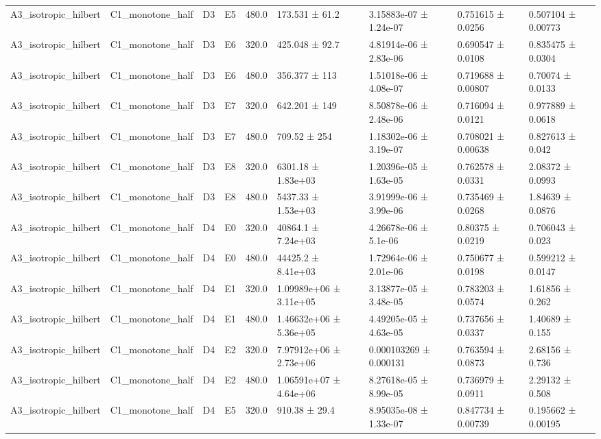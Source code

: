\begin{table}
\begin{tabular}{lllllllll}
A3\_isotropic\_hilbert & C1\_monotone\_half & D3 & E5 & 480.0 & 173.531 ± 61.2 & 3.15883e-07 ± 1.24e-07 & 0.751615 ± 0.0256 & 0.507104 ± 0.00773 \\
A3\_isotropic\_hilbert & C1\_monotone\_half & D3 & E6 & 320.0 & 425.048 ± 92.7 & 4.81914e-06 ± 2.83e-06 & 0.690547 ± 0.0108 & 0.835475 ± 0.0304 \\
A3\_isotropic\_hilbert & C1\_monotone\_half & D3 & E6 & 480.0 & 356.377 ± 113 & 1.51018e-06 ± 4.08e-07 & 0.719688 ± 0.00807 & 0.70074 ± 0.0133 \\
A3\_isotropic\_hilbert & C1\_monotone\_half & D3 & E7 & 320.0 & 642.201 ± 149 & 8.50878e-06 ± 2.48e-06 & 0.716094 ± 0.0121 & 0.977889 ± 0.0618 \\
A3\_isotropic\_hilbert & C1\_monotone\_half & D3 & E7 & 480.0 & 709.52 ± 254 & 1.18302e-06 ± 3.19e-07 & 0.708021 ± 0.00638 & 0.827613 ± 0.042 \\
A3\_isotropic\_hilbert & C1\_monotone\_half & D3 & E8 & 320.0 & 6301.18 ± 1.83e+03 & 1.20396e-05 ± 1.63e-05 & 0.762578 ± 0.0331 & 2.08372 ± 0.0993 \\
A3\_isotropic\_hilbert & C1\_monotone\_half & D3 & E8 & 480.0 & 5437.33 ± 1.53e+03 & 3.91999e-06 ± 3.99e-06 & 0.735469 ± 0.0268 & 1.84639 ± 0.0876 \\
A3\_isotropic\_hilbert & C1\_monotone\_half & D4 & E0 & 320.0 & 40864.1 ± 7.24e+03 & 4.26678e-06 ± 5.1e-06 & 0.80375 ± 0.0219 & 0.706043 ± 0.023 \\
A3\_isotropic\_hilbert & C1\_monotone\_half & D4 & E0 & 480.0 & 44425.2 ± 8.41e+03 & 1.72964e-06 ± 2.01e-06 & 0.750677 ± 0.0198 & 0.599212 ± 0.0147 \\
A3\_isotropic\_hilbert & C1\_monotone\_half & D4 & E1 & 320.0 & 1.09989e+06 ± 3.11e+05 & 3.13877e-05 ± 3.48e-05 & 0.783203 ± 0.0574 & 1.61856 ± 0.262 \\
A3\_isotropic\_hilbert & C1\_monotone\_half & D4 & E1 & 480.0 & 1.46632e+06 ± 5.36e+05 & 4.49205e-05 ± 4.63e-05 & 0.737656 ± 0.0337 & 1.40689 ± 0.155 \\
A3\_isotropic\_hilbert & C1\_monotone\_half & D4 & E2 & 320.0 & 7.97912e+06 ± 2.73e+06 & 0.000103269 ± 0.000131 & 0.763594 ± 0.0873 & 2.68156 ± 0.736 \\
A3\_isotropic\_hilbert & C1\_monotone\_half & D4 & E2 & 480.0 & 1.06591e+07 ± 4.64e+06 & 8.27618e-05 ± 8.99e-05 & 0.736979 ± 0.0911 & 2.29132 ± 0.508 \\
A3\_isotropic\_hilbert & C1\_monotone\_half & D4 & E5 & 320.0 & 910.38 ± 29.4 & 8.95035e-08 ± 1.33e-07 & 0.847734 ± 0.00739 & 0.195662 ± 0.00195 \\

\end{tabular}
\end{table}
